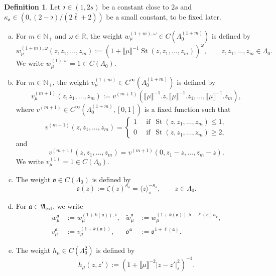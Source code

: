 \documentclass{article}
\numberwithin{equation}{section}
\newcommand{\assign}{:=}
\theoremstyle{plain}
\theoremstyle{definition}
\newtheorem{definition}[theorem]{Definition}
\begin{document}
\begin{definition}
  \label{def:weights-kernels}Let $\flat \in (1, 2 s)$ be a constant close to
  $2 s$ and $\kappa_{\mathfrak{o}} \in (0, (2-\flat) / (2 \bar{\ell} + 2))$
  be a small constant, to be fixed later.
  \begin{enumerate}[(a)]
    \item For $m \in \mathbb{N}_+$ and $\omega \in \mathbb{R}$, the weight
    $w^{(1 + m), \omega}_{\mu} \in C  (\Lambda_0^{(1 + m)})$ is defined by
    \[ w^{(1 + m), \omega}_{\mu} (z, z_1, \ldots, z_m) \assign (1 + \llbracket
       \mu \rrbracket^{- 1} \operatorname{St} (z, z_1, \ldots, z_m) )^{\omega}, \qquad
       z, z_1, \ldots, z_m \in \Lambda_0 . \]
    We write $w^{(1), \omega}_{\mu} = 1 \in C  (\Lambda_0 )$.
    
    \item For $m \in \mathbb{N}_+$, the weight $v^{(1 + m)}_{\mu} {\in
    C^{\infty}}  (\Lambda_0^{(1 + m)})$ is defined by
    \[ v^{(m + 1)}_{\mu} (z, z_1, \ldots, z_m) \assign v^{(m + 1)}
       (\llbracket \mu \rrbracket^{- 1} .z, \llbracket \mu \rrbracket^{- 1}
       .z_1, \ldots, \llbracket \mu \rrbracket^{- 1} .z_m), \]
    where $v^{(m + 1)}_{} {\in C^{\infty}}  (\Lambda_0^{(1 + m)}, [0, 1])$ is
    a fixed function such that
    \[ v^{(m + 1)} (z, z_1, \ldots, z_m) = \left\{ \begin{aligned}
         1 & ~\operatorname{if}~  \operatorname{St} (z, z_1, \ldots, z_m) \leqslant 1,\\
         0 & ~\operatorname{if}~  \operatorname{St} (z, z_1, \ldots, z_m) \geqslant 2,
       \end{aligned} \right. \]
       and
       \[
       v^{(m + 1)} (z, z_1, \ldots, z_m)=
       v^{(m + 1)} (0, z_1-z, \ldots, z_m-z).
       \]
    We write $v^{(1)}_{\mu} = 1 \in C  (\Lambda_0 )$.
    
    \item The weight $\mathfrak{o} \in C  (\Lambda_0 )$ is defined by
    \[ \mathfrak{o} (z) \assign \zeta (z)^{\kappa_{\mathfrak{o}}} = \langle z
       \rangle_s^{- \kappa_{\mathfrak{o}}}, \qquad z \in \Lambda_0 . \]
    \item For $\mathfrak{a} \in \mathfrak{A}_{\mathrm{ext}}$, we write
    \begin{align*}
       w^{\mathfrak{a}}_{\mu} &\assign
       w^{(1 + k (\mathfrak{a})), \flat}_{\mu},
       & \tilde{w}^{\mathfrak{a}}_{\mu} &\assign
       w^{(1 + k (\mathfrak{a})), \flat - \ell (\mathfrak{a})
       \kappa_{\mathfrak{o}}}_{\mu},\\
       v^{\mathfrak{a}}_{\mu} &\assign v^{(1 + k (\mathfrak{a}))}_{\mu},
       & \mathfrak{o}^{\mathfrak{a}} &{\assign
       \mathfrak{o}^{1 + \ell (\mathfrak{a})}}  .
    \end{align*}
    \item The weight $h_{\mu} \in C  (\Lambda^2_0)$ is
    defined by
    \[ h_{\mu} (z, z') \assign (1 + \llbracket \mu \rrbracket^{- 2} | z - z'
       |_s^2)^{- 1} . \]
  \end{enumerate}
\end{definition}
\end{document}
